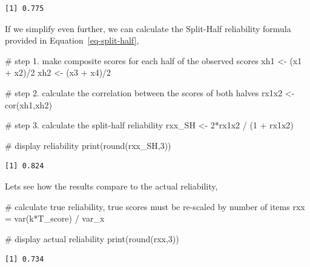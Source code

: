 \documentclass[
  letterpaper,
  DIV=11,
  numbers=noendperiod]{scrreprt}
\newenvironment{Shaded}{\begin{snugshade}}{\end{snugshade}}
\newcommand{\CommentTok}[1]{\textcolor[rgb]{0.37,0.37,0.37}{#1}}
\newcommand{\DecValTok}[1]{\textcolor[rgb]{0.68,0.00,0.00}{#1}}
\newcommand{\FunctionTok}[1]{\textcolor[rgb]{0.28,0.35,0.67}{#1}}
\newcommand{\NormalTok}[1]{\textcolor[rgb]{0.00,0.23,0.31}{#1}}
\newcommand{\OtherTok}[1]{\textcolor[rgb]{0.00,0.23,0.31}{#1}}
\newcommand{\SpecialCharTok}[1]{\textcolor[rgb]{0.37,0.37,0.37}{#1}}
\begin{document}
\begin{verbatim}
[1] 0.775
\end{verbatim}

If we simplify even further, we can calculate the Split-Half reliability
formula provided in Equation~\ref{eq-split-half},

\begin{Shaded}
\begin{Highlighting}[]
\CommentTok{\# step 1. make composite scores for each half of the observed scores}
\NormalTok{xh1 }\OtherTok{\textless{}{-}}\NormalTok{ (x1 }\SpecialCharTok{+}\NormalTok{ x2)}\SpecialCharTok{/}\DecValTok{2}
\NormalTok{xh2 }\OtherTok{\textless{}{-}}\NormalTok{ (x3 }\SpecialCharTok{+}\NormalTok{ x4)}\SpecialCharTok{/}\DecValTok{2}

\CommentTok{\# step 2. calculate the correlation between the scores of both halves}
\NormalTok{rx1x2 }\OtherTok{\textless{}{-}} \FunctionTok{cor}\NormalTok{(xh1,xh2)}

\CommentTok{\# step 3. calculate the split{-}half reliability}
\NormalTok{rxx\_SH }\OtherTok{\textless{}{-}} \DecValTok{2}\SpecialCharTok{*}\NormalTok{rx1x2 }\SpecialCharTok{/}\NormalTok{ (}\DecValTok{1} \SpecialCharTok{+}\NormalTok{ rx1x2)}

\CommentTok{\# display reliability}
\FunctionTok{print}\NormalTok{(}\FunctionTok{round}\NormalTok{(rxx\_SH,}\DecValTok{3}\NormalTok{)) }
\end{Highlighting}
\end{Shaded}

\begin{verbatim}
[1] 0.824
\end{verbatim}

Lets see how the results compare to the actual reliability,

\begin{Shaded}
\begin{Highlighting}[]
\CommentTok{\# calculate true reliability, true scores must be re{-}scaled by number of items}
\NormalTok{rxx }\OtherTok{=} \FunctionTok{var}\NormalTok{(k}\SpecialCharTok{*}\NormalTok{T\_score) }\SpecialCharTok{/}\NormalTok{ var\_x}

\CommentTok{\# display actual reliability}
\FunctionTok{print}\NormalTok{(}\FunctionTok{round}\NormalTok{(rxx,}\DecValTok{3}\NormalTok{)) }
\end{Highlighting}
\end{Shaded}

\begin{verbatim}
[1] 0.734
\end{verbatim}
\end{document}
